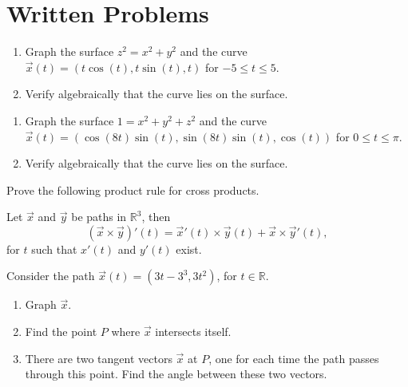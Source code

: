 \documentclass{ximera}
\begin{document}
\section{Written Problems}
\begin{problem}
\begin{enumerate}
\item Graph the surface $z^2 = x^2 +y^2$ and the curve $\vec{x}(t) = (t\cos(t), t\sin(t), t)$ for $-5\leq t\leq 5$.
\item Verify algebraically that the curve lies on the surface.
\end{enumerate}
\end{problem}

\begin{problem}
\begin{enumerate}
\item Graph the surface $1 = x^2 + y^2 + z^2$ and the curve $\vec{x}(t) = (\cos(8t)\sin(t),\sin(8t)\sin(t), \cos(t) )$ for $0\leq t\leq \pi$.
\item Verify algebraically that the curve lies on the surface.
\end{enumerate}
\end{problem}

\begin{problem}
Prove the following product rule for cross products.

Let $\vec{x}$ and $\vec{y}$ be paths in $\mathbb{R}^3$, then 
\[
(\vec{x}\times\vec{y})'(t) = \vec{x}'(t)\times\vec{y}(t) + \vec{x}\times\vec{y}'(t),
\]
for $t$ such that $x'(t)$ and $y'(t)$ exist.
\end{problem}

\begin{problem}
Consider the path $\vec{x}(t) = (3t-3^3, 3t^2)$, for $t\in\mathbb{R}$.
\begin{enumerate}
\item Graph $\vec{x}$.
\item Find the point $P$ where $\vec{x}$ intersects itself.
\item There are two tangent vectors $\vec{x}$ at $P$, one for each time the path passes through this point. Find the angle between these two vectors.
\end{enumerate}
\end{problem}
\end{document}
